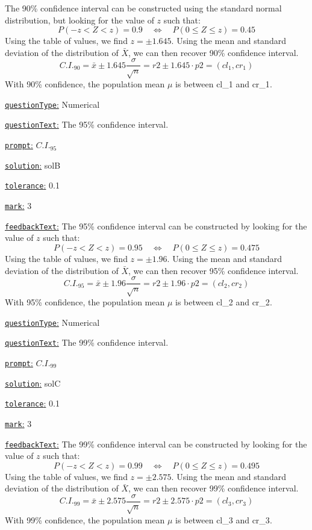 \documentclass[preview]{standalone}
\newcommand \fieldname[1]{\underline{\texttt{#1}:}}
\begin{document}
The 90\% confidence interval can be constructed using the standard normal distribution, but looking for the value of $z$ such that:
\[
P(-z < Z < z) = 0.9 \quad \iff \quad P(0 \le Z \le z) = 0.45
\]
Using the table of values, we find $z = \pm 1.645$. Using the mean and standard deviation of the distribution of $\bar X$, we can then recover 90\% confidence interval.
\[
C.I._{90} = \bar x \pm 1.645 \frac{\sigma}{\sqrt{n}} = {r2} \pm 1.645 \cdot {p2} = ({cl_1}, {cr_1})
\]
With 90\% confidence, the population mean $\mu$ is between {cl_1} and {cr_1}.

\fieldname{questionType}
Numerical

\fieldname{questionText}
The 95\% confidence interval.

\fieldname{prompt}
$C.I._{95}$

\fieldname{solution}
solB

\fieldname{tolerance}
0.1

\fieldname{mark}
3

\fieldname{feedbackText}
The 95\% confidence interval can be constructed by looking for the value of $z$ such that:
\[
P(-z < Z < z) = 0.95 \quad \iff \quad P(0 \le Z \le z) = 0.475
\]
Using the table of values, we find $z = \pm 1.96$. Using the mean and standard deviation of the distribution of $\bar X$, we can then recover 95\% confidence interval.
\[
C.I._{95} = \bar x \pm 1.96 \frac{\sigma}{\sqrt{n}} = {r2} \pm 1.96 \cdot {p2} = ({cl_2}, {cr_2})
\]
With 95\% confidence, the population mean $\mu$ is between {cl_2} and {cr_2}.

\fieldname{questionType}
Numerical

\fieldname{questionText}
The 99\% confidence interval.

\fieldname{prompt}
$C.I._{99}$

\fieldname{solution}
solC

\fieldname{tolerance}
0.1

\fieldname{mark}
3

\fieldname{feedbackText}
The 99\% confidence interval can be constructed by looking for the value of $z$ such that:
\[
P(-z < Z < z) = 0.99 \quad \iff \quad P(0 \le Z \le z) = 0.495
\]
Using the table of values, we find $z = \pm 2.575$. Using the mean and standard deviation of the distribution of $\bar X$, we can then recover 99\% confidence interval.
\[
C.I._{99} = \bar x \pm 2.575 \frac{\sigma}{\sqrt{n}} = {r2} \pm 2.575 \cdot {p2} = ({cl_3}, {cr_3})
\]
With 99\% confidence, the population mean $\mu$ is between {cl_3} and {cr_3}.

\end{document}
